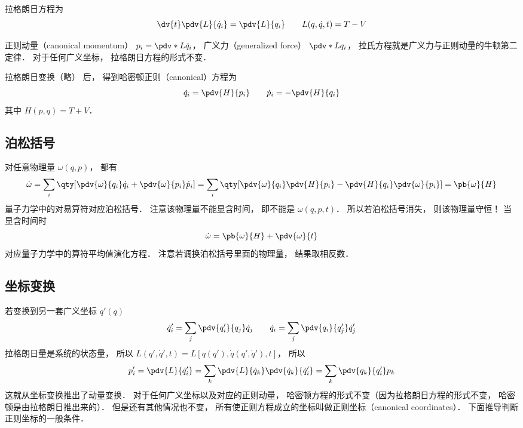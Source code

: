 


拉格朗日方程为
 \begin{equation}
\dv{t} \pdv{L}{\dot q_i}  = \pdv{L}{q_i}  \qquad L(q,\dot q, t) = T - V
\end{equation}

正则动量（canonical momentum） $p_i = \pdv*{L}{\dot q_i}$，  广义力（generalized force） $\pdv*{L}{q_i}$，  拉氏方程就是广义力与正则动量的牛顿第二定律． 对于任何广义坐标， 拉格朗日方程的形式不变．

拉格朗日变换（略） 后， 得到哈密顿正则（canonical）方程为
\begin{equation}
\dot q_i = \pdv{H}{p_i} \qquad
\dot p_i = -\pdv{H}{q_i}
\end{equation} 
其中 $H(p,q) = T + V$． 

\subsection{泊松括号}

对任意物理量 $\omega (q,p)$，   都有
\begin{equation}
\dot \omega  = \sum_i \qty[ \pdv{\omega}{q_i} \dot q_i + \pdv{\omega}{p_i} \dot p_i ]  = \sum_i \qty[\pdv{\omega}{q_i} \pdv{H}{p_i} - \pdv{H}{q_i} \pdv{\omega}{p_i} ]  =  \pb{\omega}{H} 
\end{equation}
量子力学中的对易算符对应泊松括号． 注意该物理量不能显含时间， 即不能是 $\omega (q,p,t)$．  所以若泊松括号消失， 则该物理量守恒！ 当显含时间时
\begin{equation}
\dot \omega  =  \pb{\omega}{H}  + \pdv{\omega}{t}
\end{equation}
对应量子力学中的算符平均值演化方程． 注意若调换泊松括号里面的物理量， 结果取相反数．


\subsection{坐标变换}

若变换到另一套广义坐标 $q'(q)$
\begin{equation}
\dot q'_i = \sum_j \pdv{q'_i}{q_j} \dot q_j \qquad
\dot q_i = \sum_j \pdv{q_i}{q'_j} \dot q'_j
\end{equation}
拉格朗日量是系统的状态量， 所以 $L(q',\dot q', t) = L[q(q'),\dot q(q',\dot q'), t]$，  所以
\begin{equation}
p'_i = \pdv{L}{\dot q'_i} = \sum_k \pdv{L}{\dot q_k} \pdv{\dot q_k}{\dot q'_i}  = \sum_k \pdv{q_k}{q'_i} p_k
\end{equation}
这就从坐标变换推出了动量变换． 对于任何广义坐标以及对应的正则动量， 哈密顿方程的形式不变（因为拉格朗日方程的形式不变， 哈密顿是由拉格朗日推出来的）． 但是还有其他情况也不变， 所有使正则方程成立的坐标叫做正则坐标（canonical coordinates）． 下面推导判断正则坐标的一般条件．

